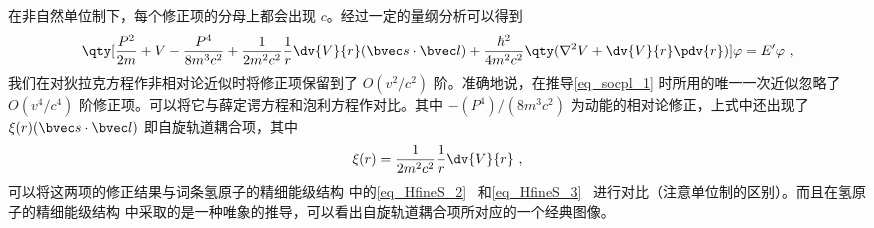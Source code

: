 在非自然单位制下，每个修正项的分母上都会出现 $c$。经过一定的量纲分析可以得到
\begin{equation}\label{eq_socpl_4}
\qty[\frac{P^2}{2m}+V-\frac{P^4}{8m^3c^2}+\frac{1}{2m^2c^2}\frac{1}{r}\dv{V}{r}(\bvec s\cdot \bvec l)+\frac{\hbar^2}{4m^2c^2}\qty(\nabla^2 V+\dv{V}{r}\pdv{r})]\varphi = E'\varphi~,
\end{equation}
我们在对狄拉克方程作非相对论近似时将修正项保留到了 $O(v^2/c^2)$ 阶。准确地说，在推导\autoref{eq_socpl_1} 时所用的唯一一次近似忽略了 $O(v^4/c^4)$ 阶修正项。可以将它与薛定谔方程和泡利方程作对比。其中 $-(P^4)/(8m^3c^2)$ 为动能的相对论修正，上式中还出现了 $\xi(r)(\bvec s\cdot \bvec l)$ 即自旋轨道耦合项，其中
\begin{equation}
\xi(r)=\frac{1}{2m^2c^2}\frac{1}{r}\dv{V}{r}~,
\end{equation}
可以将这两项的修正结果与词条氢原子的精细能级结构 中的\autoref{eq_HfineS_2}~ 和\autoref{eq_HfineS_3}~ 进行对比（注意单位制的区别）。而且在氢原子的精细能级结构 中采取的是一种唯象的推导，可以看出自旋轨道耦合项所对应的一个经典图像。

